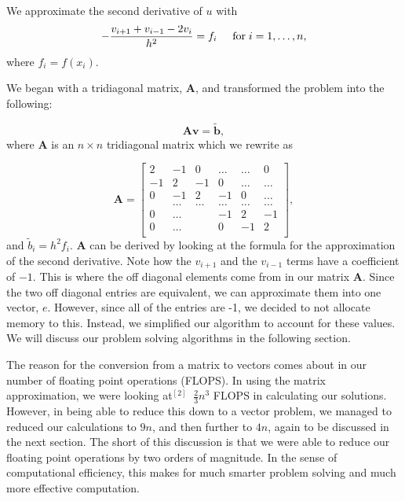 \documentclass{article}
\begin{document}
We  approximate the second derivative of $u$ with
\begin{equation*}
-\frac{v_{i+1}+v_{i-1}-2v_i}{h^2} = f_i  \hspace{0.5cm} \mathrm{for} \hspace{0.1cm} i=1,\dots, n,
\end{equation*}
where $f_i=f(x_i)$.



We began with a tridiagonal matrix, $\mathbf{A}$, and transformed the problem into the following:

\begin{equation*}
\mathbf{A}\mathbf{v} = \tilde{\mathbf{b}},
\end{equation*}
where $\mathbf{A}$ is an $n\times n$  tridiagonal matrix which we rewrite as

\[
\mathbf{A} = \begin{bmatrix}
2& -1& 0 &\dots   & \dots &0 \\
-1 & 2 & -1 &0 &\dots &\dots \\
0&-1 &2 & -1 & 0 & \dots \\
& \dots   & \dots &\dots   &\dots & \dots \\
0&\dots   &  &-1 &2& -1 \\
0&\dots    &  & 0  &-1 & 2 \\
\end{bmatrix},
\]
and $\tilde{b}_i=h^2f_i$.  $\mathbf{A}$ can be derived by looking at the formula for the approximation of the second derivative. Note how the $v_{i+1}$ and the $v_{i-1}$ terms have a coefficient of $-1$. This is where the off diagonal elements come from in our matrix $\mathbf{A}$. Since the two off diagonal entries are equivalent, we can approximate them into one vector, $e$. However, since all of the entries are -1, we decided to not allocate memory to this. Instead, we simplified our algorithm to account for these values. We will discuss our problem solving algorithms in the following section.

The reason for the conversion from a matrix to vectors comes about in our number of floating point operations (FLOPS). In using the matrix approximation, we were looking at$^{[2]}$ $~\frac{2}{3}n^{3}$ FLOPS in calculating our solutions. However, in being able to reduce this down to a vector problem, we managed to reduced our calculations to $9n$, and then further to $4n$, again to be discussed in the next section. The short of this discussion is that we were able to reduce our floating point operations by two orders of magnitude. In the sense of computational efficiency, this makes for much smarter problem solving and much more effective computation. 
\end{document}

